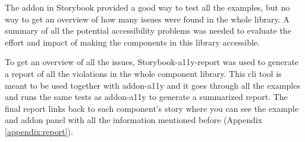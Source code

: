 \documentclass{master_thesis}
\begin{document}
The addon in Storybook provided a good way to test all the examples, but no way to get an overview of how many issues were found in the whole library. A summary of all the potential accessibility problems was needed to evaluate the effort and impact of making the components in this library accessible.

To get an overview of all the issues, Storybook-a11y-report \citep{Karube2020} was used to generate a report of all the violations in the whole component library. This \ac{cli} tool is meant to be used together with addon-a11y and it goes through all the examples and runs the same tests as addon-a11y to generate a summarized report. The final report links back to each component's story where you can see the example and addon panel with all the information mentioned before (Appendix \ref{appendix:report}).
\end{document}
